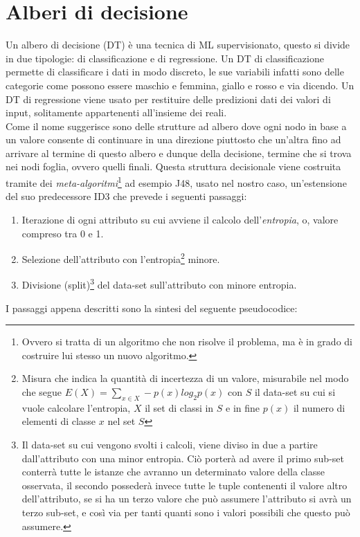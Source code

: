 \section{Alberi di decisione} 
Un albero di decisione (DT) è una tecnica di ML supervisionato, questo si divide in due tipologie: di classificazione e di regressione.
Un DT di classificazione permette di classificare i dati in modo discreto, le sue variabili infatti sono delle categorie come possono essere maschio e femmina, giallo e rosso e via dicendo.
Un DT di regressione viene usato per restituire delle predizioni dati dei valori di input, solitamente appartenenti all'insieme dei reali.\\
Come il nome suggerisce sono delle strutture ad albero dove ogni nodo in base a un valore consente di continuare in una direzione piuttosto che un'altra fino ad arrivare al termine di questo albero e dunque della decisione, termine che si trova nei nodi foglia, ovvero quelli finali.
Questa struttura decisionale viene costruita tramite dei \emph{meta-algoritmi}\footnote{Ovvero si tratta di un algoritmo che non risolve il problema, ma è in grado di costruire lui stesso un nuovo algoritmo.} ad esempio J48, usato nel nostro caso, un'estensione del suo predecessore ID3 che prevede i seguenti passaggi:
\newpage
\begin{enumerate}
	\item Iterazione di ogni attributo su cui avviene il calcolo dell'\emph{entropia}, o, valore compreso tra 0 e 1.
	\item Selezione dell'attributo con l'entropia\footnote{Misura che indica la quantità di incertezza di un valore, misurabile nel modo che segue $E\left(X\right) = \sum_{x\in X} -p\left(x\right)log_{2}p(x)$ con $S$ il data-set su cui si vuole calcolare l'entropia, $X$ il set di classi in $S$ e in fine $p\left(x\right)$ il numero di elementi di classe $x$ nel set $S$} minore.
	\item Divisione (split)\footnote{Il data-set su cui vengono svolti i calcoli, viene diviso in due a partire dall'attributo con una minor entropia. Ciò porterà ad avere il primo sub-set conterrà tutte le istanze che avranno un determinato valore della classe osservata, il secondo possederà invece tutte le tuple contenenti il valore altro dell'attributo, se si ha un terzo valore che può assumere l'attributo si avrà un terzo sub-set, e così via per tanti quanti sono i valori possibili che questo può assumere.} del data-set sull'attributo con minore entropia.
\end{enumerate}
I passaggi appena descritti sono la sintesi del seguente pseudocodice:

